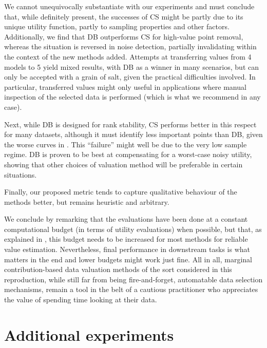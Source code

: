 \documentclass[10pt]{article}
\begin{document}
We cannot unequivocally substantiate  with our
experiments and must conclude that, while definitely present, the successes of
CS might be partly due to its unique utility function, partly to sampling
properties and other factors. Additionally, we find that DB outperforms CS for
high-value point removal, whereas the situation is reversed in noise
detection, partially invalidating  within the
context of the new methods added. Attempts at transferring values from 4
models to 5 yield mixed results, with DB as a winner in many scenarios, but
 can only be accepted with a grain of salt,
given the practical difficulties involved. In particular, transferred values
might only useful in applications where manual inspection of the selected data
is performed (which is what we recommend in any case).

Next, while DB is designed for rank stability, CS performs better in this
respect for many datasets, although it must identify less important points
than DB, given the worse curves in . This ``failure''
might well be due to the very low sample regime. DB is proven to be best at
compensating for a worst-case noisy utility, showing that other choices of
valuation method will be preferable in certain situations.

Finally, our proposed metric  tends to capture qualitative
behaviour of the methods better, but remains heuristic and arbitrary.

We conclude by remarking that the evaluations have been done at a constant
computational budget (in terms of utility evaluations) when possible, but
that, as explained in , this budget needs to be
increased for most methods for reliable value estimation. Nevertheless, final
performance in downstream tasks is what matters in the end and lower budgets
might work just fine. All in all, marginal contribution-based data valuation
methods of the sort considered in this reproduction, while still far from
being fire-and-forget, automatable data selection mechanisms, remain a tool in
the belt of a cautious practitioner who appreciates the value of spending time
looking at their data.



\appendix\section{Additional experiments}
\end{document}
